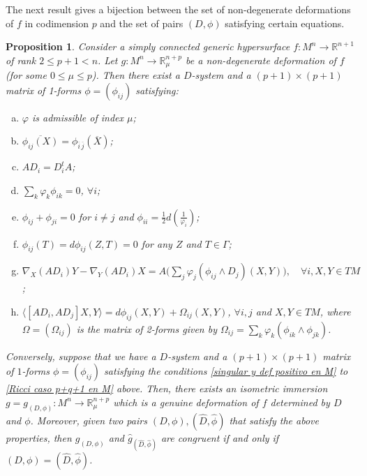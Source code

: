 \documentclass{article}
\newtheorem{prop}[thm]{Proposition}
\theoremstyle{remark}
\begin{document}
The next result gives a bijection between the set of non-degenerate deformations of $f$ in codimension $p$ and the set of pairs $(D,\phi)$ satisfying certain equations. 
\begin{prop}\label{caracterizacion en M dim p+q+1}
    Consider a simply connected generic hypersurface $f:M^n\rightarrow\mathbb{R}^{n+1}$ of rank 
    $2\leq p+1<n$. Let $g:M^n\rightarrow\mathbb{R}^{n+p}_{\mu}$ be a non-degenerate deformation of $f$ (for some $0\leq \mu\leq p$). Then there exist a $D$-system and a $(p+1)\times(p+1)$ matrix of 1-forms $\phi=(\phi_{ij})$ satisfying: 
    \begin{enumerate}[a)]
        \item $\varphi$ is admissible of index $\mu$;\label{singular y def positivo en M}
        \item $\overline{\phi_{ij}(X)}=\phi_{\overline{i}\,\overline{j}}(\overline{X})$\label{varphi y phi admisible};
        \item $AD_i=D_i^t A$; \label{A_i es simetrico caso p+q+1 en M}
        \item $\sum_k\varphi_k\phi_{ik}=0$, $\forall i$; \label{kernel de S esta en el kernel de phi}
        \item $\phi_{ij}+\phi_{ji}=0$ for $i\neq j$ and $\phi_{ii}=\frac{1}{2}d(\frac{1}{\varphi_i})$; \label{phi_ij+phi_ji caso p+q+1 en M} 
        \item $\phi_{ij}(T)=d\phi_{ij}(Z,T)=0$ for any $Z$ and $T\in\Gamma$;\label{phi_ij baja}
        \item $\nabla_X(AD_i)Y-\nabla_Y(AD_i)X=A\Big(\sum_{j}\varphi_j(\phi_{ij}\wedge D_j)(X,Y)\Big),\quad\forall i,X,Y\in TM$; \label{Codazzi caso p+q+1 en M}
        \item $\langle [AD_i,AD_j]X,Y\rangle=d\phi_{ij}(X,Y)+\Omega_{ij}(X,Y)$, $\forall i,j$ and $X,Y\in TM$, where $\Omega=(\Omega_{ij})$ is the matrix of 2-forms given by 
        $\Omega_{ij}=\sum_k\varphi_k(\phi_{ik}\wedge\phi_{jk})$.\label{Ricci caso p+q+1 en M}
    \end{enumerate}
    Conversely, suppose that we have a $D$-system and a $(p+1)\times(p+1)$ matrix of $1$-forms $\phi=(\phi_{ij})$ satisfying the conditions \ref{singular y def positivo en M} to \ref{Ricci caso p+q+1 en M} above. Then, there exists an isometric immersion $g=g_{(D,\phi)}:M^n\rightarrow\mathbb{R}^{n+p}_{\mu}$ which is a genuine deformation of $f$ determined by $D$ and $\phi$.
    Moreover, given two pairs $(D,\phi),(\hat{D},\hat{\phi})$ that satisfy the above properties, then $g_{(D,\phi)}$ and $\hat{g}_{(\hat{D},\hat{\phi})}$ are congruent if and only if $(D,\phi)=(\hat{D},\hat{\phi})$.
\end{prop}
\end{document}

